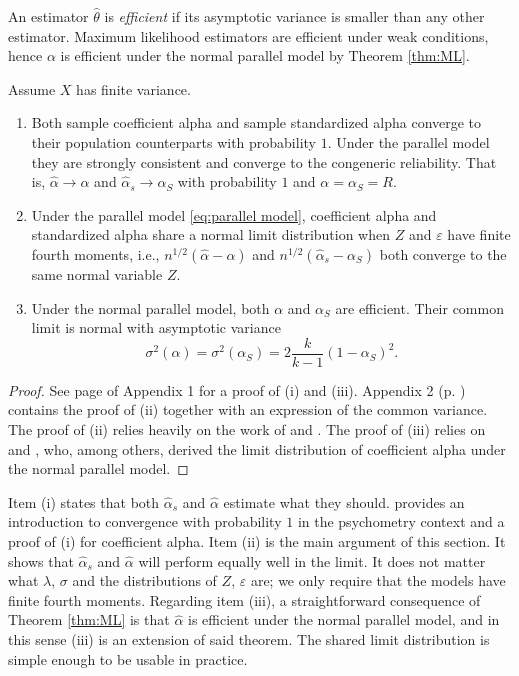 \documentclass[twoside]{article}
\begin{document}
An estimator $\hat{\theta}$ is \textit{efficient} \citep[][Section 4.3]{Lehmann2004-ke} if its asymptotic variance is smaller than any other estimator. Maximum likelihood estimators are efficient under weak conditions, hence $\alpha$ is efficient under the normal parallel model by Theorem \ref{thm:ML}.  

\begin{thm}
\label{thm:asymptotics}
Assume $X$ has finite variance. 
\begin{enumerate}[label=(\roman*)]
    \item Both sample coefficient alpha and sample standardized alpha converge to their population counterparts with probability $1$. Under the parallel model they are strongly consistent and converge to the congeneric reliability. That is, $\hat{\alpha}\to\alpha$ and $\hat{\alpha}_s\to\alpha_S$ with probability $1$ and $\alpha = \alpha_S =  R$.
    \item Under the parallel model \eqref{eq:parallel model}, coefficient alpha and standardized alpha share a normal limit distribution when $Z$ and $\varepsilon$ have finite fourth moments, i.e., $n^{1/2}(\hat{\alpha} - \alpha)$ and  $n^{1/2}(\hat{\alpha}_s - \alpha_S)$ both converge to the same normal variable $Z$.
    \item Under the normal parallel model, both $\alpha$ and $\alpha_S$ are efficient. Their common limit is normal with asymptotic variance 
    $$\sigma^{2}(\alpha)= \sigma^{2}(\alpha_S)=2\frac{k}{k-1}(1-\alpha_S)^{2}.$$
\end{enumerate}
\end{thm}    
\begin{proof}
See page \pageref{proof:asymptotics} of Appendix 1 for a proof of (i) and (iii). Appendix 2 (p. \pageref{Appendix 2}) contains the proof of (ii) together with an expression of the common variance. The proof of (ii) relies heavily on the work of \citet{Van_Zyl2000-si} and \citet{hayashi2005note}. The proof of (iii) relies on \citet[][eq. 13]{Van_Zyl2000-si} and \citet[][eq. 58]{Kristof1963-tb}, who, among others, derived the limit distribution of coefficient alpha under the normal parallel model.
\end{proof}

\begin{rem}
Item (i) states that both $\hat{\alpha}_s$ and $\hat{\alpha}$ estimate what they should. \citet{Raykov2019-tv} provides an introduction to convergence with probability $1$ in the psychometry context and a proof of (i) for coefficient alpha. Item (ii) is the main argument of this section. It shows that $\hat{\alpha}_{s}$ and $\hat{\alpha}$ will perform equally well in the limit. It does not matter what $\lambda$, $\sigma$ and the distributions of $Z$, $\varepsilon$ are; we only require that the models have finite fourth moments. Regarding item (iii), a straightforward consequence of Theorem \ref{thm:ML} is that $\hat{\alpha}$ is efficient under the normal parallel model, and in this sense (iii) is an extension of said theorem. The shared limit distribution is simple enough to be usable in practice.
\end{rem}
\end{document}
